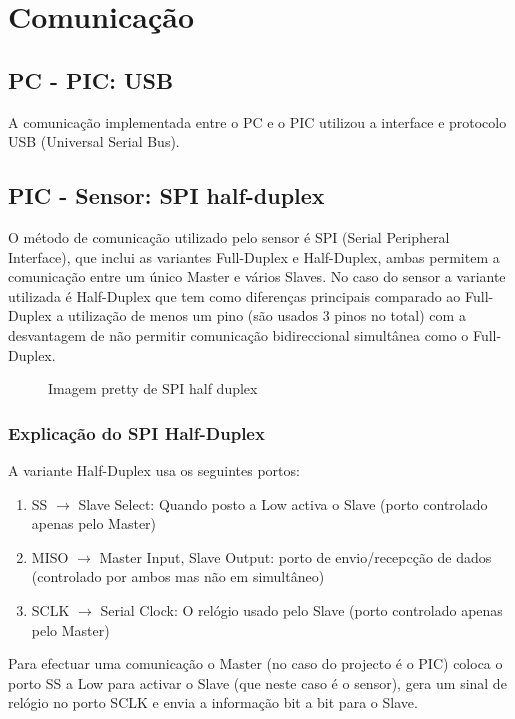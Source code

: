 \documentclass[a4paper]{article}
\begin{document}


\tableofcontents
\pagebreak

\section{Comunicação}

\subsection{PC - PIC: USB}
A comunicação implementada entre o PC e o PIC utilizou a interface e protocolo USB (Universal Serial Bus).

\subsection{PIC - Sensor: SPI half-duplex}
O método de comunicação utilizado pelo sensor é SPI (Serial Peripheral Interface), que inclui as variantes Full-Duplex e Half-Duplex, ambas permitem a comunicação entre um único Master e vários Slaves.
No caso do sensor a variante utilizada é Half-Duplex que tem como diferenças principais comparado ao Full-Duplex a utilização de menos um pino (são usados 3 pinos no total) com a desvantagem de não permitir comunicação bidireccional simultânea como o Full-Duplex.

\begin{figure}[H]
\centering

\caption{Imagem pretty de SPI half duplex}
\label{fig:SPI_halfduplex}
\end{figure}

\subsubsection{Explicação do SPI Half-Duplex}  
A variante Half-Duplex usa os seguintes portos:
\begin{enumerate}
    \item SS $\rightarrow$ Slave Select: Quando posto a Low activa o Slave (porto controlado apenas pelo Master)
    \item MISO $\rightarrow$ Master Input, Slave Output: porto de envio/recepcção de dados (controlado por ambos mas não em simultâneo)
    \item SCLK $\rightarrow$ Serial Clock: O relógio usado pelo Slave (porto controlado apenas pelo Master)
\end{enumerate}

Para efectuar uma comunicação o Master (no caso do projecto é o PIC) coloca o porto SS a Low para activar o Slave (que neste caso é o sensor), gera um sinal de relógio no porto SCLK e envia a informação bit a bit para o Slave.
\end{document}
